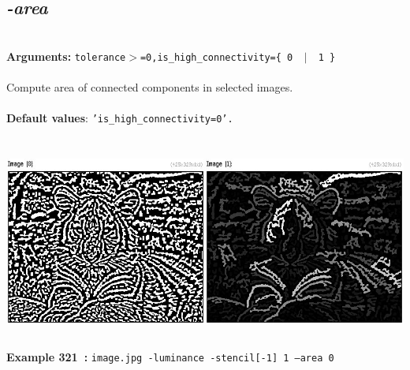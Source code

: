 \documentclass[a4paper,11pt,twoside]{book}
\begin{document}
\subsection{\emph{-area} }\vspace*{-0.5em}
~\\\textbf{Arguments: } 
{\small \texttt{tolerance$>$=0,is\_high\_connectivity=\{ 0 ~$|$~ 1 \}}}\\~\\
Compute area of connected components in selected images.
~\\~\\\textbf{Default values}: {\small \texttt{'is\_high\_connectivity=0'.}}
\begin{center}\includegraphics[keepaspectratio=true,height=7cm,width=\textwidth]{img/gmic_def321.jpg}\\
{\footnotesize \textbf{Example 321~:} \texttt{image.jpg -luminance -stencil[-1] 1 --area 0}}
\end{center}
\end{document}
